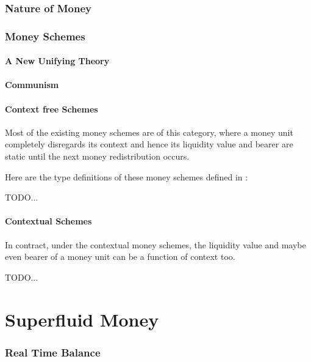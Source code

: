 \documentclass{article}
\begin{document}
\section{Nature of Money}

\section{Money Schemes}

\subsection{A New Unifying Theory}



\subsection{Communism}



\subsection{Context free Schemes}

Most of the existing money schemes are of this category, where a money unit completely disregards its context and hence
its liquidity value and bearer are static until the next money redistribution occurs.

Here are the type definitions of these money schemes defined in \cite{buldas2021unifying}:

TODO...

\subsection{Contextual Schemes}

In contract, under the contextual money schemes, the liquidity value and maybe even bearer of a money unit can be a
function of context too.

TODO...

\newpage
\part{Superfluid Money}
\newpage

\section{Real Time Balance}
\end{document}
